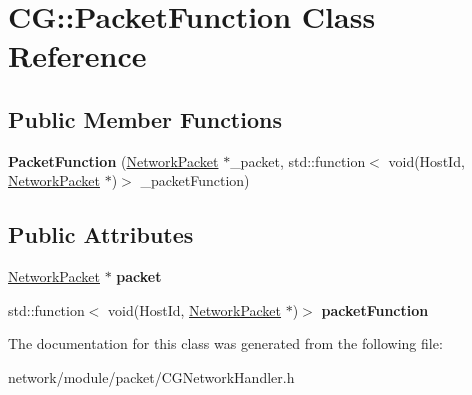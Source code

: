 \hypertarget{class_c_g_1_1_packet_function}{}\section{CG\+:\+:Packet\+Function Class Reference}
\label{class_c_g_1_1_packet_function}
\subsection*{Public Member Functions}
\begin{DoxyCompactItemize}
\item 
\mbox{\label{class_c_g_1_1_packet_function_ad6e2c920b53d850ca57eb7d43a515790}} 
{\bfseries Packet\+Function} (\mbox{\hyperlink{class_c_g_1_1_network_packet}{Network\+Packet}} $\ast$\+\_\+packet, std\+::function$<$ void(Host\+Id, \mbox{\hyperlink{class_c_g_1_1_network_packet}{Network\+Packet}} $\ast$)$>$ \+\_\+packet\+Function)
\end{DoxyCompactItemize}
\subsection*{Public Attributes}
\begin{DoxyCompactItemize}
\item 
\mbox{\label{class_c_g_1_1_packet_function_a68ae3f738b28992508c174a7c9594f78}} 
\mbox{\hyperlink{class_c_g_1_1_network_packet}{Network\+Packet}} $\ast$ {\bfseries packet}
\item 
\mbox{\label{class_c_g_1_1_packet_function_ac96cd18a7b637cea1bd5f7db6b08570d}} 
std\+::function$<$ void(Host\+Id, \mbox{\hyperlink{class_c_g_1_1_network_packet}{Network\+Packet}} $\ast$)$>$ {\bfseries packet\+Function}
\end{DoxyCompactItemize}


The documentation for this class was generated from the following file\+:\begin{DoxyCompactItemize}
\item 
network/module/packet/C\+G\+Network\+Handler.\+h\end{DoxyCompactItemize}
